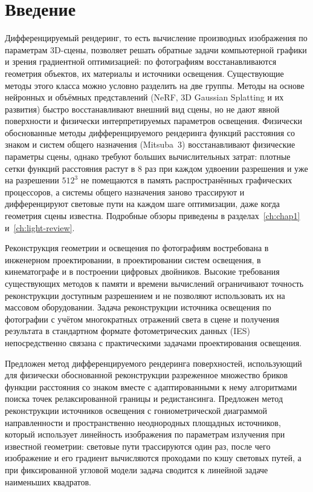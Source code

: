 \chapter*{Введение}
\label{ch:intro}

Дифференцируемый рендеринг, то есть вычисление производных изображения по параметрам 3D-сцены, позволяет решать обратные задачи компьютерной графики и зрения градиентной оптимизацией: по фотографиям восстанавливаются геометрия объектов, их материалы и источники освещения. Существующие методы этого класса можно условно разделить на две группы. Методы на основе нейронных и объёмных представлений (NeRF, 3D Gaussian Splatting и их развития) быстро восстанавливают внешний вид сцены, но не дают явной поверхности и физически интерпретируемых параметров освещения. Физически обоснованные методы дифференцируемого рендеринга функций расстояния со знаком и систем общего назначения (Mitsuba~3) восстанавливают физические параметры сцены, однако требуют больших вычислительных затрат: плотные сетки функций расстояния растут в 8 раз при каждом удвоении разрешения и уже на разрешении $512^3$ не помещаются в память распространённых графических процессоров, а системы общего назначения заново трассируют и дифференцируют световые пути на каждом шаге оптимизации, даже когда геометрия сцены известна. Подробные обзоры приведены в разделах~\ref{ch:chap1} и~\ref{ch:light-review}.

Реконструкция геометрии и освещения по фотографиям востребована в инженерном проектировании, в проектировании систем освещения, в кинематографе и в построении цифровых двойников. Высокие требования существующих методов к памяти и времени вычислений ограничивают точность реконструкции доступным разрешением и не позволяют использовать их на массовом оборудовании. Задача реконструкции источника освещения по фотографии с учётом многократных отражений света в сцене и получения результата в стандартном формате фотометрических данных (IES) непосредственно связана с практическими задачами проектирования освещения.

Предложен метод дифференцируемого рендеринга поверхностей, использующий для физически обоснованной реконструкции разреженное множество бриков функции расстояния со знаком вместе с адаптированными к нему алгоритмами поиска точек релаксированной границы и редистансинга. Предложен метод реконструкции источников освещения с гониометрической диаграммой направленности и пространственно неоднородных площадных источников, который использует линейность изображения по параметрам излучения при известной геометрии: световые пути трассируются один раз, после чего изображение и его градиент вычисляются проходами по кэшу световых путей, а при фиксированной угловой модели задача сводится к линейной задаче наименьших квадратов.

